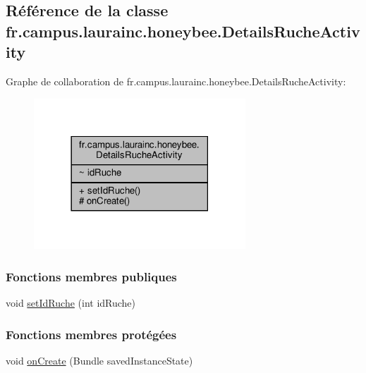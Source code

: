 \hypertarget{classfr_1_1campus_1_1laurainc_1_1honeybee_1_1_details_ruche_activity}{}\subsection{Référence de la classe fr.\+campus.\+laurainc.\+honeybee.\+Details\+Ruche\+Activity}
\label{classfr_1_1campus_1_1laurainc_1_1honeybee_1_1_details_ruche_activity}


Graphe de collaboration de fr.\+campus.\+laurainc.\+honeybee.\+Details\+Ruche\+Activity\+:\nopagebreak
\begin{figure}[H]
\begin{center}
\leavevmode
\includegraphics[width=225pt]{classfr_1_1campus_1_1laurainc_1_1honeybee_1_1_details_ruche_activity__coll__graph}
\end{center}
\end{figure}
\subsubsection*{Fonctions membres publiques}
\begin{DoxyCompactItemize}
\item 
void \hyperlink{classfr_1_1campus_1_1laurainc_1_1honeybee_1_1_details_ruche_activity_a3b80f41947ee1ea91f410697e6d93f6a}{set\+Id\+Ruche} (int id\+Ruche)
\end{DoxyCompactItemize}
\subsubsection*{Fonctions membres protégées}
\begin{DoxyCompactItemize}
\item 
void \hyperlink{classfr_1_1campus_1_1laurainc_1_1honeybee_1_1_details_ruche_activity_a025e4e802a728d7bd3e68aa7c0f40a08}{on\+Create} (Bundle saved\+Instance\+State)
\end{DoxyCompactItemize}



